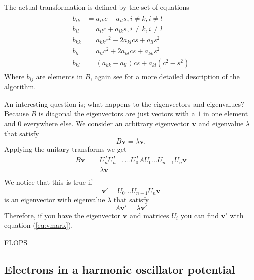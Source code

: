 \documentclass[reprint,english,notitlepage,nofootinbib]{revtex4-1}  %
\begin{document}
The actual transformation is defined by the set of equations
\begin{align}
\begin{split}
	b_{ik} &= a_{ik}c - a_{il}s, i \neq k, i \neq l \\
	b_{il} &= a_{il}c + a_{ik}s, i \neq k, i \neq l \\
	b_{kk} &= a_{kk}c^2 - 2a_{kl}cs + a_{ll}s^2 \\
	b_{ll} &= a_{ll}c^2 + 2a_{kl}cs + a_{kk}s^2 \\
	b_{kl} &= (a_{kk} - a_{ll} )cs + a_{kl}(c^2 - s^2)
	\label{eq:jacobi}
\end{split}
\end{align}
Where $b_{ij}$ are elements in $B$, again see \citep{lecnotes} for a more detailed description of the algorithm.

An interesting question is; what happens to the eigenvectors and eigenvalues? Because $B$ is diagonal the eigenvectors are just vectors with a $1$ in one element and $0$ everywhere else. We consider an arbitrary eigenvector $\mathbf{v}$ and eigenvalue $\lambda$ that satisfy
\begin{equation*}
	B\mathbf{v} = \lambda \mathbf{v} .
\end{equation*}
Applying the unitary transforms we get
\begin{align*}
	B\mathbf{v} &= U_n^T U_{n-1}^T ... U_0^T A U_0 ... U_{n-1}U_n \mathbf{v} \\
	&= \lambda \mathbf{v} \\
 \end{align*}
We notice that this is true if
\begin{equation}
	\mathbf{v'} = U_0 ... U_{n-1}U_n \mathbf{v}
	\label{eq:vmark}
\end{equation}
is an eigenvector with eigenvalue $\lambda$ that satisfy
\begin{equation*}
	A \mathbf{v}' = \lambda \mathbf{v}'
\end{equation*}
Therefore, if you have the eigenvector $\mathbf{v}$ and matrices $U_i$ you can find $\mathbf{v}'$ with equation (\ref{eq:vmark}).

FLOPS

\subsection{Electrons in a harmonic oscillator potential}
\end{document}

